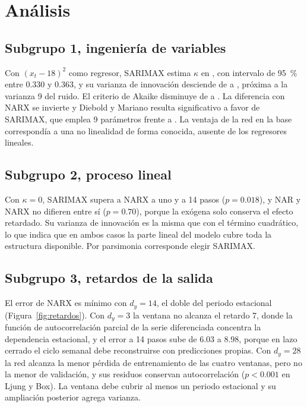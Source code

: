 \documentclass[11pt,letterpaper]{article}
\begin{document}
\section{Análisis}

\subsection{Subgrupo 1, ingeniería de variables}

Con $(x_t-18)^2$ como regresor, SARIMAX estima $\kappa$ en \kapCuad, con intervalo de 95~\% entre 0.330 y 0.363, y su varianza de innovación desciende de \sigBase{} a \sigCuad, próxima a la varianza 9 del ruido. El criterio de Akaike disminuye de \aicBase{} a \aicCuad. La diferencia con NARX se invierte y Diebold y Mariano resulta significativo a favor de SARIMAX, que emplea 9 parámetros frente a \pBase. La ventaja de la red en la base correspondía a una no linealidad de forma conocida, ausente de los regresores lineales.

\subsection{Subgrupo 2, proceso lineal}

Con $\kappa=0$, SARIMAX supera a NARX a uno y a 14 pasos ($p=0.018$), y NAR y NARX no difieren entre sí ($p=0.70$), porque la exógena solo conserva el efecto retardado. Su varianza de innovación es la misma que con el término cuadrático, lo que indica que en ambos casos la parte lineal del modelo cubre toda la estructura disponible. Por parsimonia corresponde elegir SARIMAX.

\subsection{Subgrupo 3, retardos de la salida}

El error de NARX es mínimo con $d_y=14$, el doble del periodo estacional (Figura~\ref{fig:retardos}). Con $d_y=3$ la ventana no alcanza el retardo 7, donde la función de autocorrelación parcial de la serie diferenciada concentra la dependencia estacional, y el error a 14 pasos sube de 6.03 a 8.98, porque en lazo cerrado el ciclo semanal debe reconstruirse con predicciones propias. Con $d_y=28$ la red alcanza la menor pérdida de entrenamiento de las cuatro ventanas, pero no la menor de validación, y sus residuos conservan autocorrelación ($p<0.001$ en Ljung y Box). La ventana debe cubrir al menos un periodo estacional y su ampliación posterior agrega varianza.
\end{document}
